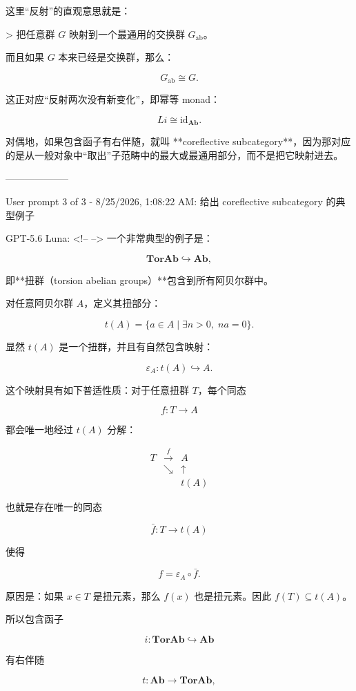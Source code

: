 \documentclass{ctexart}
\begin{document}
\begin{markdown}
这里“反射”的直观意思就是：

> 把任意群 $G$ 映射到一个最通用的交换群 $G_{\mathrm{ab}}$。

而且如果 $G$ 本来已经是交换群，那么：

$$
G_{\mathrm{ab}}\cong G.
$$

这正对应“反射两次没有新变化”，即幂等 monad：

$$
L i\cong \mathrm{id}_{\mathbf{Ab}}.
$$

对偶地，如果包含函子有右伴随，就叫 **coreflective subcategory**，因为那对应的是从一般对象中“取出”子范畴中的最大或最通用部分，而不是把它映射进去。

--------------------

User prompt 3 of 3 - 8/25/2026, 1:08:22 AM:
给出 coreflective subcategory 的典型例子

GPT-5.6 Luna:
<!--  -->
一个非常典型的例子是：

$$
\mathbf{TorAb}\hookrightarrow \mathbf{Ab},
$$

即**扭群（torsion abelian groups）**包含到所有阿贝尔群中。

对任意阿贝尔群 $A$，定义其扭部分：

$$
t(A)=\{a\in A\mid \exists n>0,\;na=0\}.
$$

显然 $t(A)$ 是一个扭群，并且有自然包含映射：

$$
\varepsilon_A:t(A)\hookrightarrow A.
$$

这个映射具有如下普适性质：对于任意扭群 $T$，每个同态

$$
f:T\to A
$$

都会唯一地经过 $t(A)$ 分解：

$$
\begin{array}{ccc}
T & \xrightarrow{f} & A\\
& \searrow & \uparrow\\
&&t(A)
\end{array}
$$

也就是存在唯一的同态

$$
\bar f:T\to t(A)
$$

使得

$$
f=\varepsilon_A\circ\bar f.
$$

原因是：如果 $x\in T$ 是扭元素，那么 $f(x)$ 也是扭元素。因此 $f(T)\subseteq t(A)$。

所以包含函子

$$
i:\mathbf{TorAb}\hookrightarrow\mathbf{Ab}
$$

有右伴随

$$
t:\mathbf{Ab}\to\mathbf{TorAb},
$$


\end{markdown}
\end{document}
